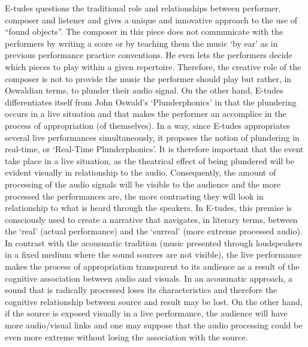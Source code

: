 	E-tudes questions the traditional role and relationships between performer, composer and listener and gives a unique and innovative approach to the use of “found objects”. The composer in this piece does not communicate with the performers by writing a score or by teaching them the music ‘by ear’ as in previous performance practice conventions. He even lets the performers decide which pieces to play within a given repertoire. Therefore, the creative role of the composer is not to provide the music the performer should play but rather, in Oswaldian terms, to plunder their audio signal. On the other hand, E-tudes differentiates itself from John Oswald’s ‘Plunderphonics’ in that the plundering occurs in a live situation and that makes the performer an accomplice in the process of appropriation (of themselves). In a way, since E-tudes appropriates several live performances simultaneously, it proposes the notion of plundering in real-time, or ‘Real-Time Plunderphonics’. It is therefore important that the event take place in a live situation, as the theatrical effect of being plundered will be evident visually in relationship to the audio. Consequently, the amount of processing of the audio signals will be visible to the audience and the more processed the performances are, the more contrasting they will look in relationship to what is heard through the speakers. In E-tudes, this premise is consciously used to create a narrative that navigates, in literary terms, between the ‘real’ (actual performance) and the ‘surreal’ (more extreme processed audio). In contrast with the acousmatic tradition (music presented through loudspeakers in a fixed medium where the sound sources are not visible), the live performance makes the process of appropriation transparent to its audience as a result of the cognitive association between audio and visuals. In an acousmatic approach, a sound that is radically processed loses its characteristics and therefore the cognitive relationship between source and result may be lost. On the other hand, if the source is exposed visually in a live performance, the audience will have more audio/visual links and one may suppose that the audio processing could be even more extreme without losing the association with the source. 
